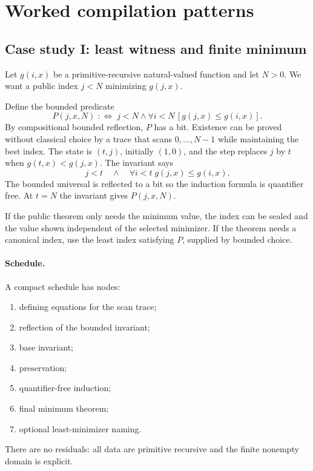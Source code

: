 \section{Worked compilation patterns}\label{sec:cases}

\subsection{Case study I: least witness and finite minimum}

Let \(g(i,x)\) be a primitive-recursive natural-valued function and let \(N>0\).  We want a public
index \(j<N\) minimizing \(g(j,x)\).

Define the bounded predicate
\[
 P(j,x,N)\;:\Longleftrightarrow\;j<N\land
   \forall i<N\,[g(j,x)\le g(i,x)].
\]
By compositional bounded reflection, \(P\) has a bit.  Existence can be proved without classical
choice by a trace that scans \(0,\ldots,N-1\) while maintaining the best index.  The state is
\((t,j)\), initially \((1,0)\), and the step replaces \(j\) by \(t\) when
\(g(t,x)<g(j,x)\).  The invariant says
\[
 j<t\quad\land\quad\forall i<t\;g(j,x)\le g(i,x).
\]
The bounded universal is reflected to a bit so the induction formula is quantifier free.  At
\(t=N\) the invariant gives \(P(j,x,N)\).

If the public theorem only needs the minimum value, the index can be sealed and the value shown
independent of the selected minimizer.  If the theorem needs a canonical index, use the least index
satisfying \(P\), supplied by bounded choice.

\paragraph{Schedule.}
A compact schedule has nodes:

\begin{enumerate}
\item defining equations for the scan trace;
\item reflection of the bounded invariant;
\item base invariant;
\item preservation;
\item quantifier-free induction;
\item final minimum theorem;
\item optional least-minimizer naming.
\end{enumerate}

There are no residuals: all data are primitive recursive and the finite nonempty domain is explicit.

